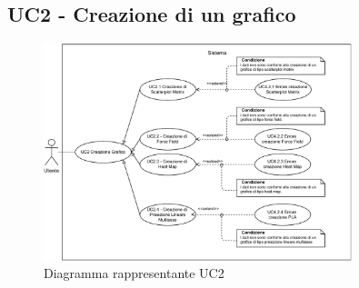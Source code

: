 \newpage

\subsection{UC2 - Creazione di un grafico}
\label{subsec:uc2}

\begin{figure}[h]
    \centering
    \includegraphics[width=0.8\textwidth]{componenti/casi-duso/diagrammi/UC2.pdf}
    \caption{Diagramma rappresentante UC2}
    \label{fig:UC2}
\end{figure}


